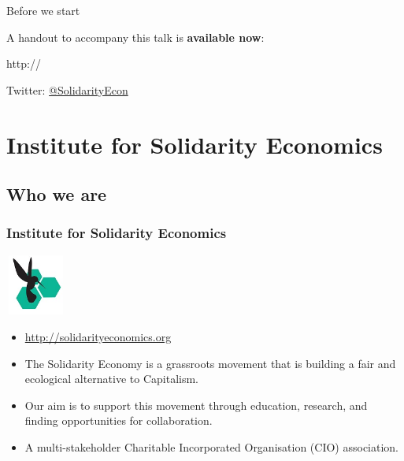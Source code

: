 \begin{frame}{Before we start}
  \begin{center}
    A handout to accompany this talk is \textbf{available now}:

    http://

	  \vspace{1cm}
    Twitter: \href{https://twitter.com/SolidarityEcon}{@SolidarityEcon}
  \end{center}
\end{frame}
\frame{\titlepage}

\frame{\tableofcontents}

\section{Institute for Solidarity Economics}
\subsection{Who we are}
\frame
{
  \frametitle{Institute for Solidarity Economics}
  \begin{center}
    \includegraphics[height=2cm,width=2cm]{ise-logo.jpg}
  \end{center}
  \begin{itemize}
    \item<1-> \url{http://solidarityeconomics.org}
    \item<1-> The Solidarity Economy is a grassroots movement that is building a fair and ecological alternative to Capitalism.
    \item<2-> Our aim is to support this movement through education, research, and finding opportunities for collaboration.
    \item<3-> A multi-stakeholder Charitable Incorporated Organisation (CIO) association.
  \end{itemize}
}
